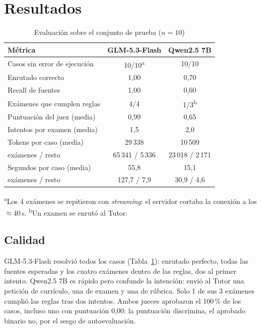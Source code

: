 \documentclass[journal]{IEEEtran}
\begin{document}
\section{Resultados}

\begin{table}[!t]
\centering
\caption{Evaluación sobre el conjunto de prueba ($n=10$)}
\label{tab:eval}
\begin{tabular}{@{}lcc@{}}
\toprule
Métrica & GLM-5.3-Flash & Qwen2.5 7B \\
\midrule
Casos sin error de ejecución & 10/10\textsuperscript{a} & 10/10 \\
Enrutado correcto & 1,00 & 0,70 \\
Recall de fuentes & 1,00 & 0,60 \\
Exámenes que cumplen reglas & 4/4 & 1/3\textsuperscript{b} \\
Puntuación del juez (media) & 0,99 & 0,65 \\
Intentos por examen (media) & 1,5 & 2,0 \\
Tokens por caso (media) & 29\,338 & 10\,509 \\
\quad exámenes / resto & 65\,341 / 5\,336 & 23\,018 / 2\,171 \\
Segundos por caso (media) & 55,8 & 15,1 \\
\quad exámenes / resto & 127,7 / 7,9 & 30,9 / 4,6 \\
\bottomrule
\end{tabular}

\vspace{2pt}
\footnotesize\raggedright
\textsuperscript{a}Los 4 exámenes se repitieron con \emph{streaming}: el servidor cortaba
la conexión a los $\approx$40\,s. \textsuperscript{b}Un examen se enrutó al Tutor.
\end{table}

\subsection{Calidad}
GLM-5.3-Flash resolvió todos los casos (Tabla~\ref{tab:eval}): enrutado perfecto, todas las
fuentes esperadas y los cuatro exámenes dentro de las reglas, dos al primer intento.
Qwen2.5 7B es rápido pero confunde la intención: envió al Tutor una petición de currículo,
una de examen y una de rúbrica. Solo 1 de sus 3 exámenes cumplió las reglas tras dos
intentos. Ambos jueces aprobaron el 100\,\% de los casos, incluso uno con puntuación 0,00:
la puntuación discrimina, el aprobado binario no, por el sesgo de autoevaluación.
\end{document}
